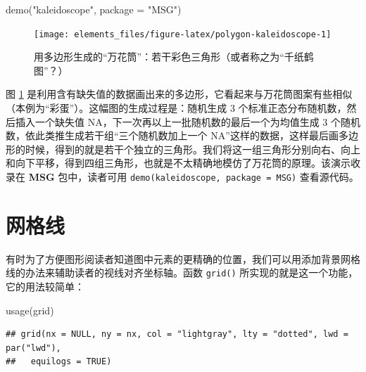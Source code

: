 \documentclass[
  b5paper,
  UTF8,twoside]{book}
\newenvironment{Shaded}{\begin{snugshade}}{\end{snugshade}}
\newcommand{\AttributeTok}[1]{\textcolor[rgb]{0.77,0.63,0.00}{#1}}
\newcommand{\FunctionTok}[1]{\textcolor[rgb]{0.00,0.00,0.00}{#1}}
\newcommand{\NormalTok}[1]{#1}
\newcommand{\StringTok}[1]{\textcolor[rgb]{0.31,0.60,0.02}{#1}}
\begin{document}
\begin{Shaded}
\begin{Highlighting}[]
\FunctionTok{demo}\NormalTok{(}\StringTok{"kaleidoscope"}\NormalTok{, }\AttributeTok{package =} \StringTok{"MSG"}\NormalTok{)}
\end{Highlighting}
\end{Shaded}

\begin{figure}

{\centering \texttt{[image: elements\_files/figure-latex/polygon-kaleidoscope-1]} 

}

\caption[ 用多边形生成的“万花筒”]{用多边形生成的``万花筒''：若干彩色三角形（或者称之为``千纸鹤图''？）}\label{fig:polygon-kaleidoscope}
\end{figure}



图 \ref{fig:polygon-kaleidoscope} 是利用含有缺失值的数据画出来的多边形，它看起来与万花筒图案有些相似（本例为``彩蛋''）。这幅图的生成过程是：随机生成 3 个标准正态分布随机数，然后插入一个缺失值 NA，下一次再以上一批随机数的最后一个为均值生成 3 个随机数，依此类推生成若干组``三个随机数加上一个 NA''这样的数据，这样最后画多边形的时候，得到的就是若干个独立的三角形。我们将这一组三角形分别向右、向上和向下平移，得到四组三角形，也就是不太精确地模仿了万花筒的原理。该演示收录在 \textbf{MSG} 包中，读者可用 \texttt{demo(\textquotesingle{}kaleidoscope\textquotesingle{},\ package\ =\ \textquotesingle{}MSG\textquotesingle{})} 查看源代码。

\hypertarget{sec:grid}{%
\section{网格线}\label{sec:grid}}

有时为了方便图形阅读者知道图中元素的更精确的位置，我们可以用添加背景网格线的办法来辅助读者的视线对齐坐标轴。函数 \texttt{grid()} 所实现的就是这一个功能，它的用法较简单：

\begin{Shaded}
\begin{Highlighting}[]
\FunctionTok{usage}\NormalTok{(grid)}
\end{Highlighting}
\end{Shaded}

\begin{verbatim}
## grid(nx = NULL, ny = nx, col = "lightgray", lty = "dotted", lwd = par("lwd"),
##   equilogs = TRUE)
\end{verbatim}
\end{document}
